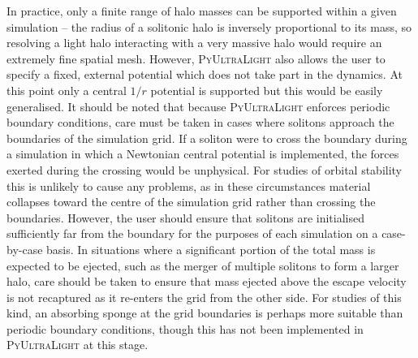 \documentclass[a4paper,11pt]{article}
\newcommand{\PyUltraLight}{\textsc{PyUltraLight}\xspace}
\begin{document}
In practice, only a finite  range of halo masses can be supported within a given simulation -- the  radius of a solitonic halo is inversely proportional to its mass, so resolving a light halo interacting with a very massive halo would require an extremely fine spatial mesh.  However, \PyUltraLight also allows the user to specify a fixed, external potential which does not take part in the dynamics. At this point only a central $1/r$ potential is supported but this would be easily generalised. It should be noted that because \PyUltraLight enforces periodic boundary conditions, care must be taken in cases where solitons approach the boundaries of the simulation grid. If a soliton were to cross the boundary during a simulation in which a Newtonian central potential is implemented, the forces exerted during the crossing would be unphysical. For studies of orbital stability this is unlikely to cause any problems, as in these circumstances material collapses toward the centre of the simulation grid rather than crossing the boundaries. However, the user should ensure that solitons are initialised sufficiently far from the boundary for the purposes of each simulation on a case-by-case basis. In situations where a significant portion of the total mass is expected to be ejected, such as the merger of multiple solitons to form a larger halo, care should be taken to ensure that mass ejected above the escape velocity is not recaptured as it re-enters the grid from the other side. For studies of this kind, an absorbing sponge at the grid boundaries is perhaps more suitable than periodic boundary conditions, though this has not been implemented in \PyUltraLight at this stage. 
 
\end{document}
